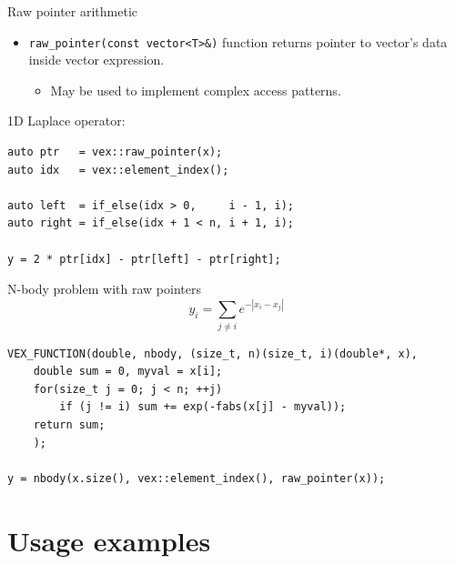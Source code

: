 \documentclass[@BEAMER_OPTIONS@]{beamer}
\newcommand{\code}[1]{\lstinline|#1|}
\begin{document}
\begin{frame}[fragile]{Raw pointer arithmetic}
    \begin{itemize}
        \item \code{raw_pointer(const vector<T>&)} function returns pointer to
            vector's data\\ inside vector expression.
            \begin{itemize}
                \item May be used to implement complex access patterns.
            \end{itemize}
    \end{itemize}
    \begin{exampleblock}{1D Laplace operator:}
        \begin{lstlisting}[keepspaces=true]
auto ptr   = vex::raw_pointer(x);
auto idx   = vex::element_index();

auto left  = if_else(idx > 0,     i - 1, i);
auto right = if_else(idx + 1 < n, i + 1, i);

y = 2 * ptr[idx] - ptr[left] - ptr[right];\end{lstlisting}
    \end{exampleblock}
\end{frame}

\note{ }

\begin{frame}[fragile]{N-body problem with raw pointers}
    \begin{equation*}
        y_i = \sum_{j \neq i} e^{-|x_i - x_j|}
    \end{equation*}
    \begin{exampleblock}{}
        \begin{lstlisting}
VEX_FUNCTION(double, nbody, (size_t, n)(size_t, i)(double*, x),
    double sum = 0, myval = x[i];
    for(size_t j = 0; j < n; ++j)
        if (j != i) sum += exp(-fabs(x[j] - myval));
    return sum;
    );

y = nbody(x.size(), vex::element_index(), raw_pointer(x));
        \end{lstlisting}
    \end{exampleblock}
\end{frame}

\note{ }

\section{Usage examples}
\begin{frame}
    \sectionpage
\end{frame}
\end{document}
